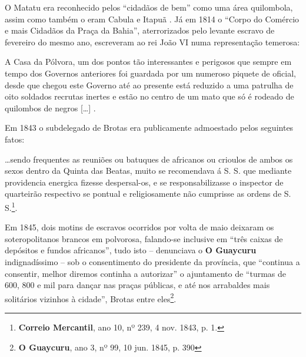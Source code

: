 O Matatu era reconhecido pelos ``cidadãos de bem'' como uma área quilombola, assim como também o eram Cabula e Itapuã \cite[p.~377]{schwartz_1814_1996}. Já em 1814 o ``Corpo do Comércio e mais Cidadãos da Praça da Bahia'', aterrorizados pelo levante escravo de fevereiro do mesmo ano, escreveram ao rei João VI numa representação temerosa:

\begin{citacao}
A Casa da Pólvora, um dos pontos tão interessantes e perigosos que sempre em tempo dos Governos anteriores foi guardada por um numeroso piquete de oficial, desde que chegou este Governo até ao presente está reduzido a uma patrulha de oito soldados recrutas inertes e estão no centro de um mato que só é rodeado de quilombos de negros [\dots] \cite[pp.~103-106]{ott_formaet2_1957}.
\end{citacao}

Em 1843 o subdelegado de Brotas era publicamente admoestado pelos seguintes fatos:

\begin{citacao}
\dots sendo frequentes as reuniões ou batuques de africanos ou crioulos de ambos os sexos dentro da Quinta das Beatas, muito se recomendava á S. S. que mediante providencia energica fizesse despersal-os, e se responsabilizasse o inspector de quarteirão respectivo se pontual e religiosamente não cumprisse as ordens de S. S.\footnote{\textbf{Correio Mercantil}, ano 10, nº 239, 4 nov. 1843, p. 1.}.
\end{citacao}

Em 1845, dois motins de escravos ocorridos por volta de maio deixaram os soteropolitanos brancos em polvorosa, falando-se inclusive em ``três caixas de depósitos e fundos africanos'', tudo isto -- denunciava o \textbf{O Guaycuru} indignadíssimo -- sob o consentimento do presidente da província, que ``continua a consentir, melhor diremos continha a autorizar'' o ajuntamento de ``turmas de  600, 800 e mil para dançar nas praças públicas, e até nos arrabaldes mais solitários vizinhos à cidade'', Brotas entre eles\footnote{\textbf{O Guaycuru}, ano 3, nº 99, 10 jun. 1845, p. 390}.

